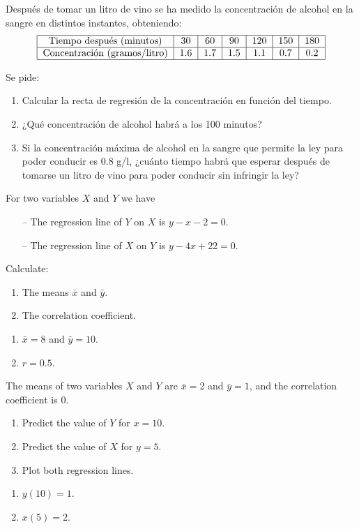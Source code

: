 {Después de tomar un litro de vino se ha medido la concentración de alcohol en la sangre en distintos instantes,
obteniendo:
\[
\begin{tabular}{|c|c|c|c|c|c|c|}
\hline
Tiempo después (minutos) & 30 & 60 & 90 & 120 & 150 & 180 \\ \hline
Concentración (gramos/litro) & 1.6 & 1.7 & 1.5 & 1.1 & 0.7 & 0.2 \\
\hline
\end{tabular}
\]

Se pide:
\begin{enumerate}
\item Calcular la recta de regresión de la concentración en función del tiempo.
\item ¿Qué concentración de alcohol habrá a los 100 minutos?
\item Si la concentración máxima de alcohol en la sangre que permite la ley para poder conducir es 0.8 g/l, ¿cuánto tiempo habrá que esperar después de tomarse un litro de vino para poder conducir sin infringir la ley?
\end{enumerate}
}
{}
{}


{For two variables $X$ and $Y$ we have
\begin{itemize}
\item[--] The regression line of $Y$ on $X$ is $y-x-2=0$.
\item[--] The regression line of $X$ on $Y$ is $y-4x+22=0$.
\end{itemize}
Calculate:
\begin{enumerate}
\item The means $\bar x$ and $\bar y$.
\item The correlation coefficient.
\end{enumerate}
}
{
\begin{enumerate}
\item $\bar x=8$ and $\bar y=10$.
\item $r=0.5$.
\end{enumerate}
}
{}


{The means of two variables $X$ and $Y$ are $\bar x=2$ and $\bar y=1$, and the correlation coefficient is 0.
\begin{enumerate}
\item  Predict the value of $Y$ for $x=10$.
\item  Predict the value of $X$ for $y=5$.
\item  Plot both regression lines.
\end{enumerate}
}
{
\begin{enumerate}
\item $y(10)=1$.
\item $x(5)=2$.
\end{enumerate}
}
{}


